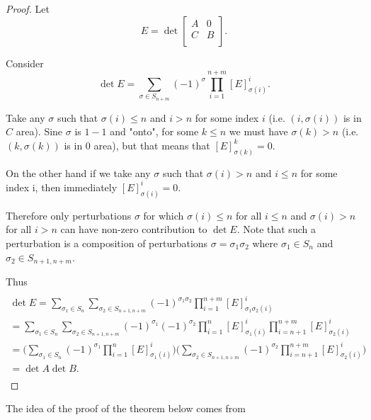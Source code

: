 \documentclass[main.tex]{subfiles}
\begin{document}
\begin{proof}
Let 
$$E = \det \begin{bmatrix}
    A &  0 \\
    C & B \\
\end{bmatrix}.$$

\noindent
Consider 
\begin{equation}
\det E = \sum\limits_{\sigma\in S_{n + m}} (-1)^\sigma \prod_{i=1}^{n+m} [E]^i_{\sigma(i)}.
\end{equation}

\noindent
Take any $\sigma$ such that $\sigma(i) \leq n$ and $i > n$ for some index $i$ (i.e. $(i, \sigma(i))$ is in $C$ area). Sine $\sigma$ is $1-1$ and "onto", for some $k \leq n$ we must have $\sigma(k) > n$ (i.e. $(k, \sigma(k))$ is in 0 area), but that means that $[E]^k_{\sigma(k)} = 0$. 

\noindent
On the other hand if we take any $\sigma$ such that $\sigma(i) > n$ and $i\leq n$ for some index i, then immediately $[E]^i_{\sigma(i)} = 0$.

\noindent
Therefore only perturbations $\sigma$ for which $\sigma(i) \leq n$ for all $i \leq n$ and $\sigma(i) > n$ for all $i > n$ can have non-zero contribution to $\det E$. Note that such a perturbation is a composition of perturbations $\sigma = \sigma_1\sigma_2$ where $\sigma_1\in S_n$ and $\sigma_2\in S_{n+1, n+m}$.

\noindent
Thus
\begin{multline*}\\
\det E = \sum\limits_{\sigma_1\in S_n} \sum\limits_{\sigma_2\in S_{n + 1, n + m}} (-1)^{\sigma_1\sigma_2} \prod\limits_{i=1}^{n+m} [E]^i_{\sigma_1\sigma_2(i)}
\\ = 
\sum\limits_{\sigma_1\in S_n} \sum\limits_{\sigma_2\in S_{n + 1, n + m}}
(-1)^{\sigma_1}(-1)^{\sigma_2} \prod_{i=1}^n [E]^i_{\sigma_1(i)} \prod_{i=n+1}^{n+m} [E]^i_{\sigma_2(i)}
\\ = \bigg(\sum\limits_{\sigma_1\in S_n} (-1)^{\sigma_1} \prod_{i=1}^n [E]^i_{\sigma_1(i)}\bigg)
\bigg(\sum\limits_{\sigma_2\in S_{n + 1, n + m}} (-1)^{\sigma_2}  \prod_{i=n+1}^{n+m} [E]^i_{\sigma_2(i)}\bigg)
\\ = \det A \det B. 
\\
\end{multline*}
\end{proof}

The idea of the proof of the theorem below comes from \cite{devito}
\end{document}
